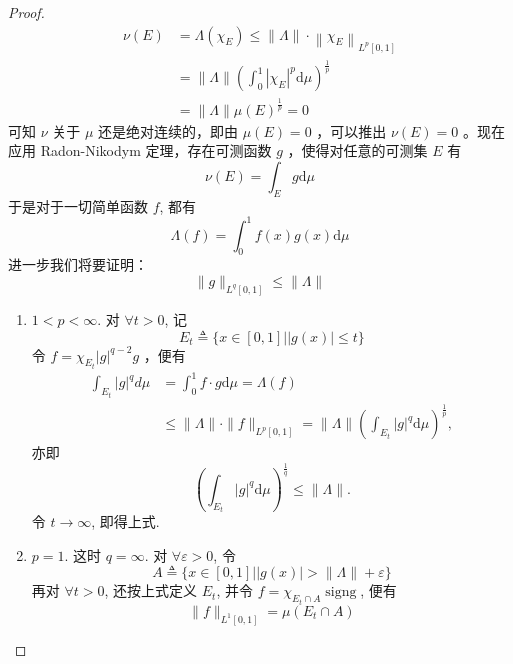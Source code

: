 \documentclass[lang=cn,newtx,10pt,scheme=chinese,thmcnt=chapter]{elegantbook}
\newcommand{\dif}{\mathrm{d}}
\begin{document}
\begin{proof}
\begin{equation*}
\begin{aligned}
\nu\left(E\right) & =\Lambda\left(\chi_{E}\right) \leqslant\|\Lambda\| \cdot\left\|\chi_{E}\right\|_{L^p[0,1]} \\
& =\|\Lambda\|\left(\int_0^1\left|\chi_{E}\right|^p \dif \mu\right)^{\frac{1}{p}} \\
& =\|\Lambda\| \mu\left(E\right)^{\frac{1}{p}}=0 
\end{aligned}
\end{equation*}
可知 $\nu$ 关于 $\mu$ 还是绝对连续的，即由 $\mu(E)=0$ ，可以推出 $\nu(E)=0$ 。现在应用 Radon-Nikodym 定理，存在可测函数 $g$ ，使得对任意的可测集 $E$ 有
\begin{equation*}
\nu(E)=\int_E g \dif \mu
\end{equation*}
于是对于一切简单函数 $f$, 都有
\begin{equation*}
\Lambda(f)=\int_0^1 f(x) g(x) \dif \mu
\end{equation*}
进一步我们将要证明：
\begin{equation*}
\|g\|_{L^q[0,1]} \leqslant\|\Lambda\|
\end{equation*}
\begin{enumerate}
    \item  $1<p<\infty$. 对 $\forall t>0$, 记
\begin{equation*}
E_t \triangleq\{x \in[0,1]| | g(x) \mid \leqslant t\}
\end{equation*}
令 $f=\chi_{E_t}|g|^{q-2} g$ ，便有
\begin{equation*}
\begin{aligned}
\int_{E_t}|g|^q d \mu & =\int_0^1 f \cdot g \dif \mu=\Lambda(f) \\
& \leqslant\|\Lambda\| \cdot\|f\|_{L^p[0,1]}=\|\Lambda\|\left(\int_{E_t}|g|^q \dif \mu\right)^{\frac{1}{p}},
\end{aligned}
\end{equation*}
亦即
\begin{equation*}
\left(\int_{E_t}|g|^q \dif \mu\right)^{\frac{1}{q}} \leqslant\|\Lambda\| .
\end{equation*}
令 $t \rightarrow \infty$, 即得上式.
\item  $p=1$. 这时 $q=\infty$. 对 $\forall \varepsilon>0$, 令
\begin{equation*}
A \triangleq\{x \in[0,1]||g(x)|>\|\Lambda\|+\varepsilon\}
\end{equation*}
再对 $\forall t>0$, 还按上式定义 $E_t$, 并令 $f=\chi_{E_t \cap A} \operatorname{signg}$, 便有
\begin{equation*}
\|f\|_{L^1[0,1]}=\mu\left(E_t \cap A\right)
\end{equation*}

\end{enumerate}
\end{proof}
\end{document}
